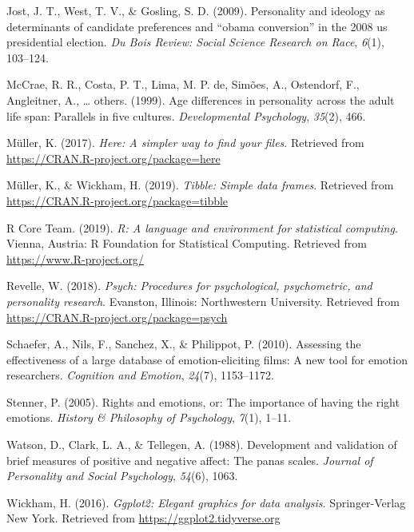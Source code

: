\documentclass[man]{apa6}
\begin{document}
\hypertarget{ref-jost2009personality}{}
Jost, J. T., West, T. V., \& Gosling, S. D. (2009). Personality and
ideology as determinants of candidate preferences and ``obama
conversion'' in the 2008 us presidential election. \emph{Du Bois Review:
Social Science Research on Race}, \emph{6}(1), 103--124.

\hypertarget{ref-mccrae1999age}{}
McCrae, R. R., Costa, P. T., Lima, M. P. de, Simões, A., Ostendorf, F.,
Angleitner, A., \ldots{} others. (1999). Age differences in personality
across the adult life span: Parallels in five cultures.
\emph{Developmental Psychology}, \emph{35}(2), 466.

\hypertarget{ref-R-here}{}
Müller, K. (2017). \emph{Here: A simpler way to find your files}.
Retrieved from \url{https://CRAN.R-project.org/package=here}

\hypertarget{ref-R-tibble}{}
Müller, K., \& Wickham, H. (2019). \emph{Tibble: Simple data frames}.
Retrieved from \url{https://CRAN.R-project.org/package=tibble}

\hypertarget{ref-R-base}{}
R Core Team. (2019). \emph{R: A language and environment for statistical
computing}. Vienna, Austria: R Foundation for Statistical Computing.
Retrieved from \url{https://www.R-project.org/}

\hypertarget{ref-R-psych}{}
Revelle, W. (2018). \emph{Psych: Procedures for psychological,
psychometric, and personality research}. Evanston, Illinois:
Northwestern University. Retrieved from
\url{https://CRAN.R-project.org/package=psych}

\hypertarget{ref-schaefer2010}{}
Schaefer, A., Nils, F., Sanchez, X., \& Philippot, P. (2010). Assessing
the effectiveness of a large database of emotion-eliciting films: A new
tool for emotion researchers. \emph{Cognition and Emotion},
\emph{24}(7), 1153--1172.

\hypertarget{ref-stenner2005rights}{}
Stenner, P. (2005). Rights and emotions, or: The importance of having
the right emotions. \emph{History \& Philosophy of Psychology},
\emph{7}(1), 1--11.

\hypertarget{ref-watson1988development}{}
Watson, D., Clark, L. A., \& Tellegen, A. (1988). Development and
validation of brief measures of positive and negative affect: The panas
scales. \emph{Journal of Personality and Social Psychology},
\emph{54}(6), 1063.

\hypertarget{ref-R-ggplot2}{}
Wickham, H. (2016). \emph{Ggplot2: Elegant graphics for data analysis}.
Springer-Verlag New York. Retrieved from
\url{https://ggplot2.tidyverse.org}
\end{document}
